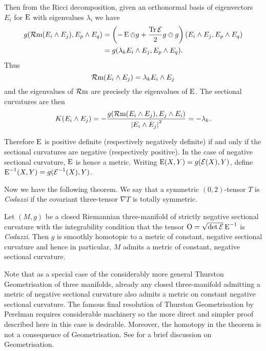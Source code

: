 \documentclass[a4paper,12pt]{amsart}
\begin{document}
Then from the Ricci decomposition, given an orthonormal basis of eigenvectors \(E_i\) for \(\operatorname{E}\) with eigenvalues \(\lambda_i\) we have
\[
\begin{split}
g(\operatorname{\mathcal{R}m}(E_i \wedge E_j), E_p \wedge E_q) &= \left(-\operatorname{E} \owedge g + \frac{\operatorname{Tr} \operatorname{\mathcal{E}}}{2} g \owedge g\right) (E_i \wedge E_j, E_p \wedge E_q) \\
&= g(\lambda_k E_i \wedge E_j, E_p \wedge E_q).
\end{split}
\]
Thus
\[
\operatorname{\mathcal{R}m}(E_i \wedge E_j) = \lambda_k E_i \wedge E_j
\]
and the eigenvalues of \(\operatorname{\mathcal{R}m}\) are precisely the eigenvalues of \(\operatorname{E}\). The sectional curvatures are then
\begin{equation}
\label{eq:sectional}
K (E_i \wedge E_j) = -\frac{g(\operatorname{\mathcal{R}m}(E_i \wedge E_j), E_j \wedge E_i)}{\left\lvert{E_i \wedge E_j}\right\rvert^2} = -\lambda_k.
\end{equation}

Therefore \(\operatorname{E}\) is positive definite (respectively negatively definite) if and only if the sectional curvatures are negative (respectively positive). In the case of negative sectional curvature, \(\operatorname{E}\) is hence a metric. Writing \(\operatorname{E}(X, Y) = g(\operatorname{\mathcal{E}}(X), Y)\), define \(\operatorname{E}^{-1}(X, Y) = g(\operatorname{\mathcal{E}}^{-1} (X), Y)\).

Now we have the following theorem. We say that a symmetric \((0,2)\)-tensor \(T\) is \emph{Codazzi} if the covariant three-tensor \(\nabla T\) is totally symmetric.

\begin{thm}
\label{thm:intg_const_curv}

Let \((M, g)\) be a closed Riemannian three-manifold of strictly negative sectional curvature with the integrability condition that the tensor \(\operatorname{O} = \sqrt{\det \operatorname{\mathcal{E}}} \operatorname{E}^{-1}\) is \emph{Codazzi}. Then \(g\) is smoothly homotopic to a metric of constant, negative sectional curvature and hence in particular, \(M\) admits a metric of constant, negative sectional curvature.
\end{thm}

Note that as a special case of the considerably more general Thurston Geometrisation of three manifolds, already any closed three-manifold admitting a metric of negative sectional curvature also admits a metric on constant negative sectional curvature. The famous final resolution of Thurston Geometrisation by Perelman requires considerable machinery so the more direct and simpler proof described here in this case is desirable. Moreover, the homotopy in the theorem is not a consequence of Geometrisation. See  for a brief discussion on Geometrisation.
\end{document}
